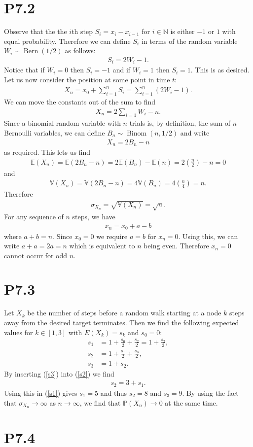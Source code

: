 \documentclass{article}
\newcommand{\N}{\mathbb{N}}
\renewcommand{\P}{\mathbb{P}}
\newcommand{\E}{\mathbb{E}}
\newcommand{\V}{\mathbb{V}}
\DeclareMathOperator{\Binom}{Binom}
\DeclareMathOperator{\Bern}{Bern}
\begin{document}
\section*{P7.2}
Observe that the the $i$th step $S_i=x_i-x_{i-1}$ for $i\in\N$ is either $-1$ or
$1$ with equal probability. Therefore we can define $S_i$ in terms of the
random variable $W_i\sim\Bern(1/2)$ as follows:
\begin{align*}
  S_i = 2W_i - 1.
\end{align*}
Notice that if $W_i=0$ then $S_i=-1$ and if $W_i=1$ then $S_i=1$. This is as
desired. Let us now consider the position at some point in time $t$:
\begin{align*}
  X_n = x_0 + \sum_{i=1}^n S_i = \sum_{i=1}^n \left(2W_i - 1\right).
\end{align*}
We can move the constants out of the sum to find
\begin{align*}
  X_n = 2\sum_{i=1}W_i - n.
\end{align*}
Since a binomial random variable with $n$ trials is, by definition, the 
sum of $n$ Bernoulli variables, we can define $B_n\sim\Binom(n,1/2)$
and write 
\begin{align*}
  X_n = 2B_n - n
\end{align*}
as required. This lets us find
\begin{align*}
  \E(X_n) = \E(2B_n-n) = 2\E(B_n)-\E(n) = 2\left(\frac{n}{2}\right)-n = 0
\end{align*}
and
\begin{align*}
  \V(X_n) = \V(2B_n-n) = 4\V(B_n) = 4\left(\frac{n}{4}\right)=n.
\end{align*}
Therefore
\begin{align*}
  \sigma_{X_n} = \sqrt{\V(X_n)} = \sqrt{n}.
\end{align*}
For any sequence of $n$ steps, we have
\begin{align*}
  x_n = x_0 + a - b
\end{align*}
where $a+b=n$. Since $x_0=0$ we require $a=b$ for $x_n=0$. Using this,
we can write $a + a = 2a = n$ which is equivalent to $n$ being even.
Therefore $x_n=0$ cannot occur for odd $n$.
\section*{P7.3}
Let $X_k$ be the number of steps before a random walk starting at a node
$k$ steps away from the desired target terminates. Then we find the following
expected values for $k\in[1,3]$ with $E(X_k) = s_k$ and $s_0=0$:
\begin{align}
  \label{s1}
  s_1 &= 1 + \frac{s_0}{2} + \frac{s_2}{2} = 1 + \frac{s_2}{2},\\
  \label{s2}
  s_2 &= 1 + \frac{s_1}{2} + \frac{s_3}{2},\\
  \label{s3}
  s_3 &= 1 + s_2.
\end{align}
By inserting (\ref{s3}) into (\ref{s2}) we find 
\begin{align*}
  s_2 = 3 + s_1.
\end{align*}
Using this in (\ref{s1}) gives $s_1=5$ and thus $s_2=8$ and $s_3=9$.
By using the fact that $\sigma_{X_n}\to\infty$ as $n\to\infty$, we find that
$\P(X_n)\to 0$ at the same time.
\section*{P7.4}
\end{document}
